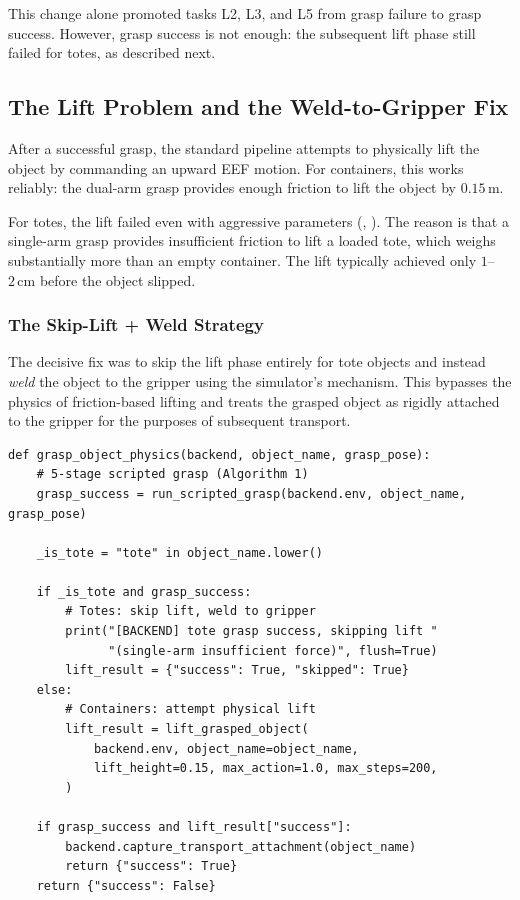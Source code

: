This change alone promoted tasks L2, L3, and L5 from grasp failure to grasp success. However, grasp success is not enough: the subsequent lift phase still failed for totes, as described next.

\subsection{The Lift Problem and the Weld-to-Gripper Fix}
\label{sec:scripted_grasp:lift}

After a successful grasp, the standard pipeline attempts to physically lift the object by commanding an upward EEF motion. For containers, this works reliably: the dual-arm grasp provides enough friction to lift the object by $0.15\,\mathrm{m}$.

For totes, the lift failed even with aggressive parameters (, ). The reason is that a single-arm grasp provides insufficient friction to lift a loaded tote, which weighs substantially more than an empty container. The lift typically achieved only $1$--$2\,\mathrm{cm}$ before the object slipped.

\subsubsection{The Skip-Lift + Weld Strategy}
\label{sec:scripted_grasp:skip_lift}

The decisive fix was to skip the lift phase entirely for tote objects and instead \emph{weld} the object to the gripper using the simulator's  mechanism. This bypasses the physics of friction-based lifting and treats the grasped object as rigidly attached to the gripper for the purposes of subsequent transport.

\begin{lstlisting}[caption={Object-type-aware lift logic (the decisive fix).}]
def grasp_object_physics(backend, object_name, grasp_pose):
    # 5-stage scripted grasp (Algorithm 1)
    grasp_success = run_scripted_grasp(backend.env, object_name, grasp_pose)

    _is_tote = "tote" in object_name.lower()

    if _is_tote and grasp_success:
        # Totes: skip lift, weld to gripper
        print("[BACKEND] tote grasp success, skipping lift "
              "(single-arm insufficient force)", flush=True)
        lift_result = {"success": True, "skipped": True}
    else:
        # Containers: attempt physical lift
        lift_result = lift_grasped_object(
            backend.env, object_name=object_name,
            lift_height=0.15, max_action=1.0, max_steps=200,
        )

    if grasp_success and lift_result["success"]:
        backend.capture_transport_attachment(object_name)
        return {"success": True}
    return {"success": False}
\end{lstlisting}

